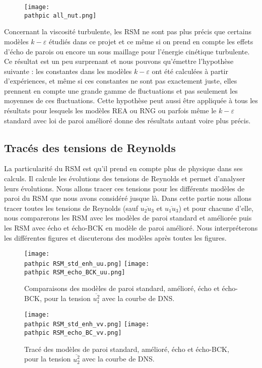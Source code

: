 \documentclass[a4paper,10pt]{article}
\newcommand\pathpic{/home/saura/Documents/Latex_files/Pic/}
\newcommand{\keps}{$k-\varepsilon$}
\newcommand{\npurple}{\color{forest}}
\newcommand\black{\color{black}}
\begin{document}
\begin{figure}[ht!]
\centering
\texttt{[image: \\pathpic all\_nut.png]}
\caption{}
\label{all_nut}
\end{figure} 
\noindent Concernant la viscosité turbulente, les RSM ne sont pas plus précis que certains modèles \keps $ $ étudiés dans ce projet et ce même si on prend en compte les effets d'écho de parois ou encore un sous maillage pour l'énergie cinétique turbulente. Ce résultat est un peu surprenant et nous pouvons qu'émettre l'hypothèse suivante : les constantes dans les modèles \keps $ $ ont été calculées à partir d'expériences, et même si ces constantes ne sont pas exactement juste, elles prennent en compte une grande gamme de fluctuations et pas seulement les moyennes de ces fluctuations. Cette hypothèse peut aussi être appliquée à tous les résultats pour lesquels les modèles REA ou RNG ou parfois même le \keps $ $ standard avec loi de paroi amélioré donne des résultats autant voire plus précis.\\
  
 \npurple \subsection{Tracés des tensions de Reynolds}  \black
 \noindent La particularité du RSM est qu'il prend en compte plus de physique dans ses calculs. Il calcule les évolutions des tensions de Reynolds et permet d'analyser leurs évolutions. Nous allons tracer ces tensions pour les différents modèles de paroi du RSM que nous avons considéré jusque là. Dans cette partie nous allons tracer toutes les tensions de Reynolds (sauf $\overline{u_2u_3}$ et $\overline{u_1u_3}$) et pour chacune d'elle, nous comparerons les RSM avec les modèles de paroi standard et améliorée puis les RSM avec écho et écho-BCK en modèle de paroi amélioré. Nous interpréterons les différentes figures et discuterons des modèles après toutes les figures.\\
 
 \begin{figure}[ht!]
 \centering
 \texttt{[image: \\pathpic RSM\_std\_enh\_uu.png]} \hfill
 \texttt{[image: \\pathpic RSM\_echo\_BCK\_uu.png]}
 \caption{Comparaisons des modèles de paroi standard, amélioré, écho et écho-BCK, pour la tension $\overline{u_1^2}$ avec la courbe de DNS.}
 \label{uu}
 \end{figure} 
 
  \begin{figure}[ht!]
 \centering
 \texttt{[image: \\pathpic RSM\_std\_enh\_vv.png]} \hfill
 \texttt{[image: \\pathpic RSM\_echo\_BC\_vv.png]}
 \caption{Tracé des modèles de paroi standard, amélioré, écho et écho-BCK, pour la tension $\overline{u_2^2}$ avec la courbe de DNS.}
 \label{vv}
 \end{figure}
 
\end{document}
